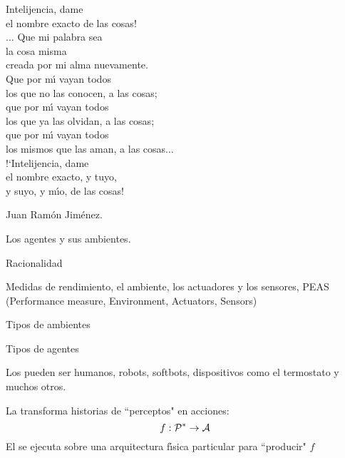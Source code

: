 \documentclass{article}
\begin{document}
\begin{huge}

\sf


Intelijencia, dame\\
el nombre exacto de las cosas!\\
$\ldots$ Que mi palabra sea\\
la cosa misma\\
creada por mi alma nuevamente.\\
Que por m{\'\i} vayan todos\\
los que no las conocen, a las cosas;\\
que por m{\'\i} vayan todos\\
los que ya las olvidan, a las cosas;\\
que por m{\'\i} vayan todos\\
los mismos que las aman, a las cosas$\ldots$\\
!`Intelijencia, dame\\
el nombre exacto, y tuyo,\\
y suyo, y m{\'\i}o, de las cosas!

            Juan Ram{\'o}n Jim{\'e}nez.


\blob Los agentes y sus ambientes.

\blob Racionalidad

\blob Medidas de rendimiento, el ambiente, los actuadores y los
sensores, PEAS (Performance measure, Environment, Actuators,
Sensors)

\blob Tipos de ambientes

\blob Tipos de agentes


\textwidth
{}

Los  pueden ser humanos, robots, softbots,
dispositivos como el termostato y muchos otros.

La  transforma historias de ``perceptos"
en acciones:
\[f: {\cal P}^* \rightarrow {\cal A}\]
El  se ejecuta sobre una arquitectura
f{\'\i}sica particular para ``producir" $f$



\end{huge}
\end{document}
